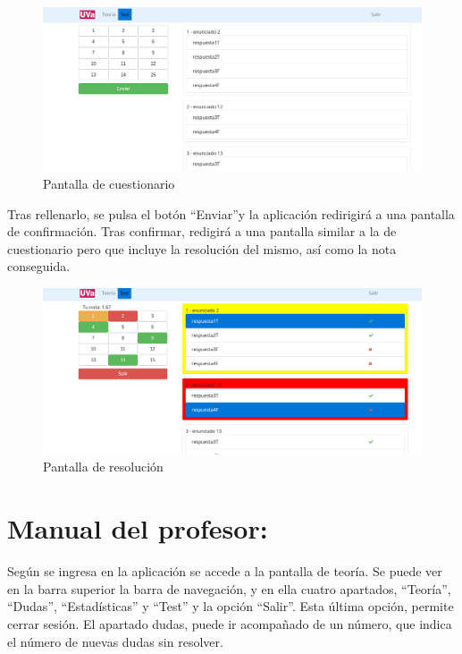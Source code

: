 \documentclass[openright,twoside,10pt]{book}
\begin{document}
    \begin{figure}[H]
        \begin{center}
            \includegraphics[width=\textwidth]{img/manual/alumno-test5.png}
        \end{center}
        \caption{Pantalla de cuestionario}
    \end{figure}
    
    Tras rellenarlo, se pulsa el botón \enquote{Enviar}y la aplicación
    redirigirá a una pantalla de confirmación. Tras confirmar, redigirá a
    una pantalla similar a la de cuestionario pero que incluye la resolución
    del mismo, así como la nota conseguida.
    
    \begin{figure}[H]
        \begin{center}
            \includegraphics[width=\textwidth]{img/manual/alumno-test6.png}
        \end{center}
        \caption{Pantalla de resolución}
    \end{figure}
    
    \section{Manual del profesor:}\label{manual-del-profesor}
    
    Según se ingresa en la aplicación se accede a la pantalla de teoría. Se
    puede ver en la barra superior la barra de navegación, y en ella cuatro
    apartados, \enquote{Teoría}, \enquote{Dudas}, \enquote{Estadísticas} y
    \enquote{Test} y la opción \enquote{Salir}. Esta última opción, permite
    cerrar sesión. El apartado dudas, puede ir acompañado de un número, que
    indica el número de nuevas dudas sin resolver.
    
\end{document}

